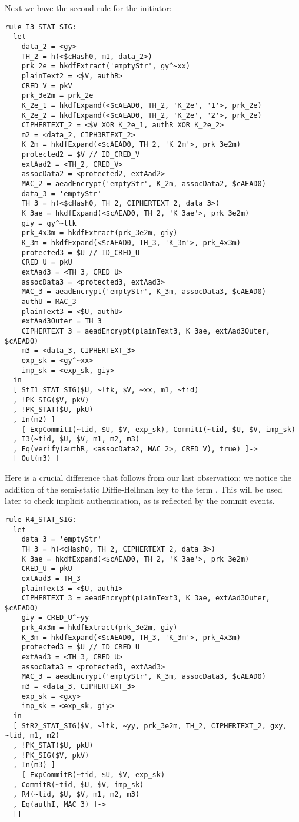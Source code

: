 Next we have the second rule for the initiator:
\begin{lstlisting}
rule I3_STAT_SIG:
  let
    data_2 = <gy> 
    TH_2 = h(<$cHash0, m1, data_2>)
    prk_2e = hkdfExtract('emptyStr', gy^~xx)
    plainText2 = <$V, authR> 
    CRED_V = pkV
    prk_3e2m = prk_2e
    K_2e_1 = hkdfExpand(<$cAEAD0, TH_2, 'K_2e', '1'>, prk_2e)
    K_2e_2 = hkdfExpand(<$cAEAD0, TH_2, 'K_2e', '2'>, prk_2e)
    CIPHERTEXT_2 = <$V XOR K_2e_1, authR XOR K_2e_2> 
    m2 = <data_2, CIPH3RTEXT_2>
    K_2m = hkdfExpand(<$cAEAD0, TH_2, 'K_2m'>, prk_3e2m)
    protected2 = $V // ID_CRED_V
    extAad2 = <TH_2, CRED_V> 
    assocData2 = <protected2, extAad2>
    MAC_2 = aeadEncrypt('emptyStr', K_2m, assocData2, $cAEAD0)
    data_3 = 'emptyStr' 
    TH_3 = h(<$cHash0, TH_2, CIPHERTEXT_2, data_3>)
    K_3ae = hkdfExpand(<$cAEAD0, TH_2, 'K_3ae'>, prk_3e2m)
    giy = gy^~ltk
    prk_4x3m = hkdfExtract(prk_3e2m, giy)
    K_3m = hkdfExpand(<$cAEAD0, TH_3, 'K_3m'>, prk_4x3m)
    protected3 = $U // ID_CRED_U
    CRED_U = pkU
    extAad3 = <TH_3, CRED_U>
    assocData3 = <protected3, extAad3>
    MAC_3 = aeadEncrypt('emptyStr', K_3m, assocData3, $cAEAD0)
    authU = MAC_3
    plainText3 = <$U, authU>
    extAad3Outer = TH_3
    CIPHERTEXT_3 = aeadEncrypt(plainText3, K_3ae, extAad3Outer, $cAEAD0)
    m3 = <data_3, CIPHERTEXT_3>
    exp_sk = <gy^~xx>
    imp_sk = <exp_sk, giy>
  in
  [ StI1_STAT_SIG($U, ~ltk, $V, ~xx, m1, ~tid) 
  , !PK_SIG($V, pkV)
  , !PK_STAT($U, pkU)
  , In(m2) ]
  --[ ExpCommitI(~tid, $U, $V, exp_sk), CommitI(~tid, $U, $V, imp_sk)
  , I3(~tid, $U, $V, m1, m2, m3)
  , Eq(verify(authR, <assocData2, MAC_2>, CRED_V), true) ]->
  [ Out(m3) ]
\end{lstlisting}
Here is a crucial difference that follows from our last observation: we notice
the addition of the semi-static Diffie-Hellman key to the term .
This will be used later to check implicit authentication, as is reflected by the
commit events.

\begin{lstlisting}
rule R4_STAT_SIG:
  let
    data_3 = 'emptyStr'
    TH_3 = h(<cHash0, TH_2, CIPHERTEXT_2, data_3>)
    K_3ae = hkdfExpand(<$cAEAD0, TH_2, 'K_3ae'>, prk_3e2m)
    CRED_U = pkU
    extAad3 = TH_3
    plainText3 = <$U, authI>
    CIPHERTEXT_3 = aeadEncrypt(plainText3, K_3ae, extAad3Outer, $cAEAD0)
    giy = CRED_U^~yy
    prk_4x3m = hkdfExtract(prk_3e2m, giy)
    K_3m = hkdfExpand(<$cAEAD0, TH_3, 'K_3m'>, prk_4x3m)
    protected3 = $U // ID_CRED_U
    extAad3 = <TH_3, CRED_U>
    assocData3 = <protected3, extAad3>
    MAC_3 = aeadEncrypt('emptyStr', K_3m, assocData3, $cAEAD0)
    m3 = <data_3, CIPHERTEXT_3>
    exp_sk = <gxy>
    imp_sk = <exp_sk, giy>
  in
  [ StR2_STAT_SIG($V, ~ltk, ~yy, prk_3e2m, TH_2, CIPHERTEXT_2, gxy, ~tid, m1, m2) 
  , !PK_STAT($U, pkU)
  , !PK_SIG($V, pkV)
  , In(m3) ]
  --[ ExpCommitR(~tid, $U, $V, exp_sk)
  , CommitR(~tid, $U, $V, imp_sk)
  , R4(~tid, $U, $V, m1, m2, m3)
  , Eq(authI, MAC_3) ]->
  []
\end{lstlisting}


